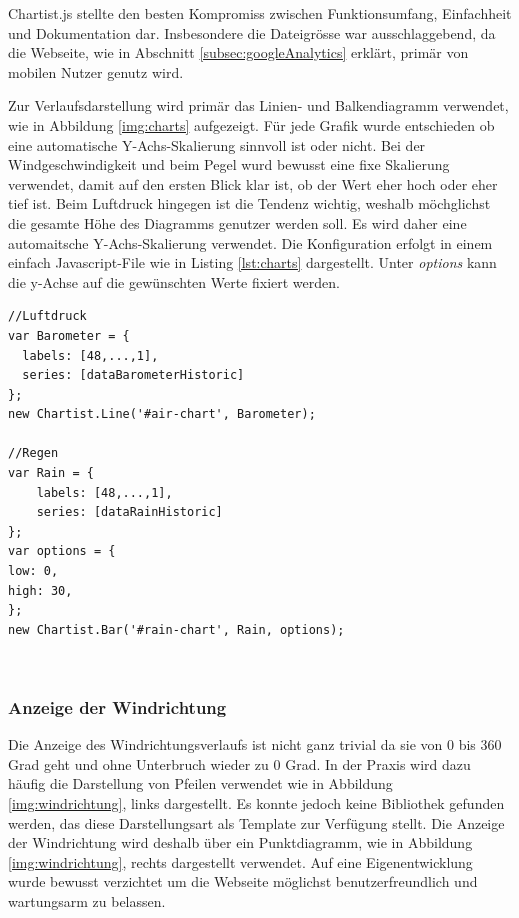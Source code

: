 \noindent
Chartist.js stellte den besten Kompromiss zwischen Funktionsumfang, Einfachheit und Dokumentation dar. Insbesondere die Dateigrösse war ausschlaggebend, da die Webseite, wie in Abschnitt \ref{subsec:googleAnalytics} erklärt, primär von mobilen Nutzer genutz wird.

Zur Verlaufsdarstellung wird primär das Linien- und Balkendiagramm verwendet, wie in Abbildung \ref{img:charts} aufgezeigt. Für jede Grafik wurde entschieden ob eine automatische Y-Achs-Skalierung sinnvoll ist oder nicht. Bei der Windgeschwindigkeit und beim Pegel wurd bewusst eine fixe Skalierung verwendet, damit auf den ersten Blick klar ist, ob der Wert eher hoch oder eher tief ist. Beim Luftdruck hingegen ist die Tendenz wichtig, weshalb möchglichst die gesamte Höhe des Diagramms genutzer werden soll. Es wird daher eine automaitsche Y-Achs-Skalierung verwendet. Die Konfiguration erfolgt in einem einfach Javascript-File wie in Listing \ref{lst:charts}  dargestellt. Unter \textit{options} kann die y-Achse auf die gewünschten Werte fixiert werden.\newline

\begin{lstlisting}[label=lst:charts,caption=Konfiguration der Verlaufsdiagramme, language=HTML5, style=htmlcssjs]
//Luftdruck
var Barometer = {
  labels: [48,...,1],
  series: [dataBarometerHistoric]
};
new Chartist.Line('#air-chart', Barometer);

//Regen
var Rain = {
	labels: [48,...,1],
	series: [dataRainHistoric]
};
var options = {
low: 0,
high: 30,
};
new Chartist.Bar('#rain-chart', Rain, options);
\end{lstlisting}
\ \\





\subsubsection{Anzeige der Windrichtung}
Die Anzeige des Windrichtungsverlaufs ist nicht ganz trivial da sie von 0 bis 360 Grad geht und ohne Unterbruch wieder zu 0 Grad. In der Praxis wird dazu häufig die Darstellung von Pfeilen verwendet wie in Abbildung \ref{img:windrichtung}, links dargestellt. Es konnte jedoch keine Bibliothek gefunden werden, das diese Darstellungsart als Template zur Verfügung stellt. Die Anzeige der Windrichtung wird deshalb über ein Punktdiagramm, wie in Abbildung \ref{img:windrichtung}, rechts dargestellt verwendet. Auf eine Eigenentwicklung wurde bewusst verzichtet um die Webseite möglichst benutzerfreundlich und wartungsarm zu belassen.

